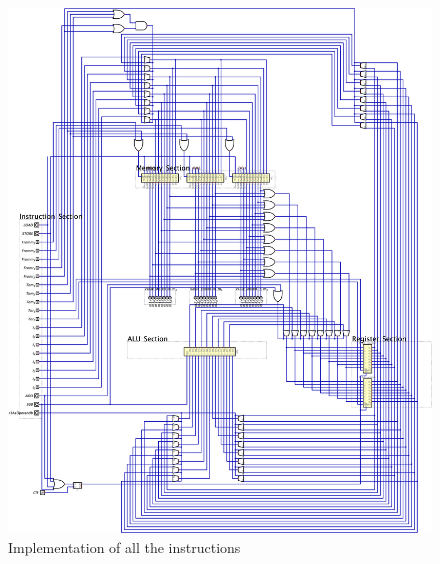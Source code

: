 \documentclass[conference]{IEEEtran}
\begin{document}
\begin{figure}[h!]
    \centering
    \includegraphics[width=\textwidth]{assets/all-instructions.png}
    \caption{Implementation of all the instructions}
    \label{fig:all-instructions-3}
\end{figure}
\end{document}
